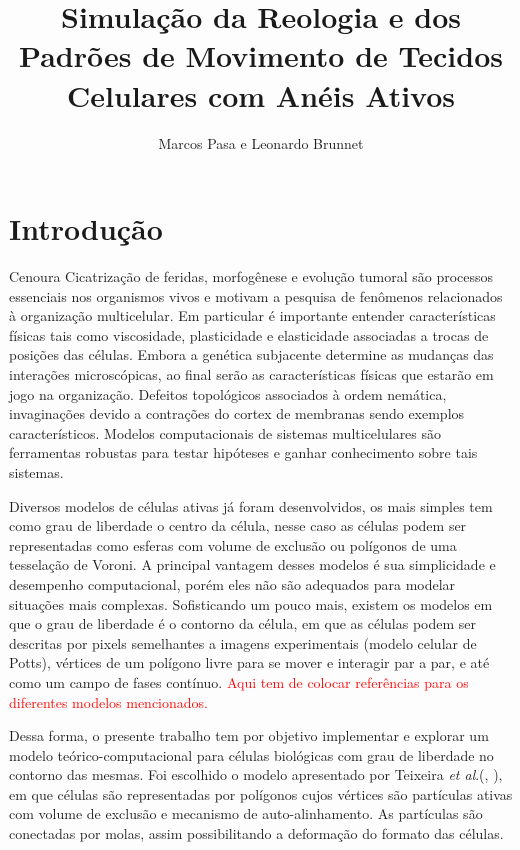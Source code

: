 \documentclass{article}
\title{Simulação da Reologia e dos Padrões de Movimento de Tecidos Celulares com Anéis Ativos}
\author{Marcos Pasa e Leonardo Brunnet}
\theoremstyle{definition}
\begin{document}
\maketitle

\section{Introdução}
Cenoura Cicatrização de feridas, morfogênese e evolução tumoral são processos essenciais nos organismos vivos e motivam a pesquisa de fenômenos relacionados à organização multicelular. Em particular é importante entender características físicas tais como viscosidade, plasticidade e elasticidade associadas a trocas de posições das células. Embora a genética subjacente determine as mudanças das interações microscópicas, ao final serão as características físicas que estarão em jogo na organização. Defeitos topológicos associados à ordem nemática, invaginações devido a contrações do cortex de membranas sendo  exemplos característicos. Modelos computacionais de sistemas multicelulares são ferramentas robustas para testar hipóteses e ganhar conhecimento sobre tais sistemas.

Diversos modelos de células ativas já foram desenvolvidos, os mais simples tem como grau de liberdade o centro da célula, nesse caso as células podem ser representadas como esferas com volume de exclusão ou polígonos de uma tesselação de Voroni. A principal vantagem desses modelos é sua simplicidade e desempenho computacional, porém eles não são adequados para modelar situações mais complexas. Sofisticando um pouco mais, existem os modelos em que o grau de liberdade é o contorno da célula, em que as células podem ser descritas por pixels semelhantes a imagens experimentais (modelo celular de Potts), vértices de um polígono livre para se mover e interagir par a par, e até como um campo de fases contínuo.
\textcolor{red}{Aqui tem de colocar referências para os diferentes modelos mencionados.}

Dessa forma, o presente trabalho tem por objetivo implementar e explorar um modelo teórico-computacional para células biológicas com grau de liberdade no contorno das mesmas. Foi escolhido o modelo apresentado por Teixeira \textit{et al}.(\cite{teixeira_single_2021}, \cite{teixeira_segregation_2024}), em que células são representadas por polígonos cujos vértices são partículas ativas com volume de exclusão e mecanismo de auto-alinhamento. As partículas são conectadas por molas, assim possibilitando a deformação do formato das células.
\end{document}
